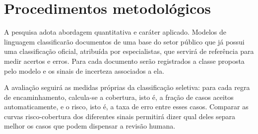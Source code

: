 
\section{Procedimentos metodológicos}

A pesquisa adota abordagem quantitativa e caráter aplicado. Modelos de
linguagem classificarão documentos de uma base do setor público que já possui
uma classificação oficial, atribuída por especialistas, que servirá de
referência para medir acertos e erros. Para cada documento serão registrados a
classe proposta pelo modelo e os sinais de incerteza associados a ela.

A avaliação seguirá as medidas próprias da classificação seletiva: para cada
regra de encaminhamento, calcula-se a cobertura, isto é, a fração de casos
aceitos automaticamente, e o risco, isto é, a taxa de erro entre esses casos.
Comparar as curvas risco-cobertura dos diferentes sinais permitirá dizer qual
deles separa melhor os casos que podem dispensar a revisão humana.
